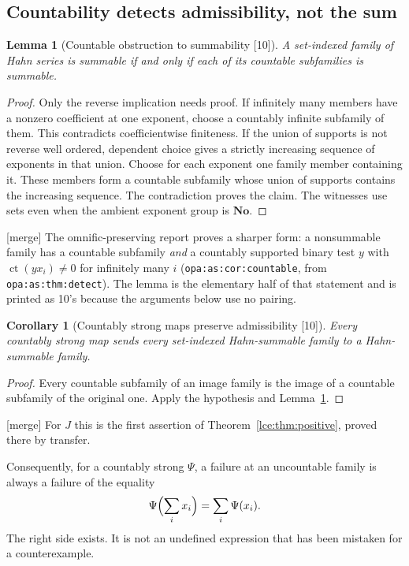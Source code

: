 \documentclass[11pt,letterpaper]{article}
\numberwithin{equation}{section}
\newtheorem{lemma}[theorem]{Lemma}
\newtheorem{corollary}[theorem]{Corollary}
\theoremstyle{definition}
\theoremstyle{remark}
\newcommand{\No}{\mathbf{No}}
\newcommand{\ct}{\operatorname{ct}}
\newcommand{\thref}[1]{Theorem~\ref{#1}}
\newcommand{\leref}[1]{Lemma~\ref{#1}}
\newcommand{\src}[1]{\textup{\textsf{\small[#1]}}}%
\newcommand{\mergetag}{\textup{\textsf{\small[merge]}}}%
\newcommand{\lbl}[1]{\nolinkurl{#1}}%
\begin{document}
\subsection{Countability detects admissibility, not the sum}
\begin{lemma}[Countable obstruction to summability \src{10}]\label{lce:mf:lem:countable}
A set-indexed family of Hahn series is summable if and only if each of its
countable subfamilies is summable.
\end{lemma}
\begin{proof}
Only the reverse implication needs proof. If infinitely many members have a
nonzero coefficient at one exponent, choose a countably infinite subfamily
of them. This contradicts coefficientwise finiteness. If the union of
supports is not reverse well ordered, dependent choice gives a strictly
increasing sequence of exponents in that union. Choose for each exponent
one family member containing it. These members form a countable subfamily
whose union of supports contains the increasing sequence. The contradiction
proves the claim. The witnesses use sets even when the ambient exponent
group is $\No$.
\end{proof}
\mergetag{} The omnific-preserving report proves a sharper form: a
nonsummable family has a countable subfamily \emph{and} a countably
supported binary test $y$ with $\ct(yx_i)\ne0$ for infinitely many $i$
(\lbl{opa:as:cor:countable}, from \lbl{opa:as:thm:detect}). The lemma is
the elementary half of that statement and is printed as 10's because the
arguments below use no pairing.

\begin{corollary}[Countably strong maps preserve admissibility \src{10}]\label{lce:mf:cor:admissibility}
Every countably strong map sends every set-indexed Hahn-summable family to a
Hahn-summable family.
\end{corollary}
\begin{proof}
Every countable subfamily of an image family is the image of a countable
subfamily of the original one. Apply the hypothesis and
\leref{lce:mf:lem:countable}.
\end{proof}
\mergetag{} For $J$ this is the first assertion of \thref{lce:thm:positive},
proved there by transfer.

Consequently, for a countably strong $\Psi$, a failure at an uncountable
family is always a failure of the equality
\begin{equation}\label{lce:mf:eq:sumdefect}
 \Psi\Bigl(\sum_ix_i\Bigr)=\sum_i\Psi(x_i).
\end{equation}
The right side exists. It is not an undefined expression that has been
mistaken for a counterexample.
\end{document}
